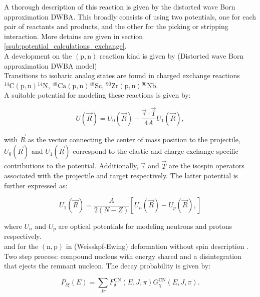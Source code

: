 \documentclass[openany]{book}
\begin{document}
A thorough description of this reaction is given by the distorted wave Born approximation DWBA. This broadly consists of using two potentials, one for each pair of reactants and products, and the other for the picking or stripping interaction. More detains are given in section \ref{ssub:potential_calculations_exchange}. \\

A development on the $\mathrm{(p,n)}$ reaction kind is given by (Distorted wave Born approximation DWBA model) \cite{whitehead_poxon-pearson_nunes_potel_2022} \\

Transitions to isobaric analog states are found in charged exchange reactions $\mathrm{{}^{14}C(p, n){}^{14}N}$, $\mathrm{{}^{48}Ca(p, n){}^{48}Sc}$, $\mathrm{{}^{90}Zr(p, n){}^{90}Nb}$. \\

A suitable potential for modeling these reactions is given by: 

\begin{equation}\label{eq:potential_exchange_optical}
	U(\vec R) = U_0(\vec R) + \frac{\vec \tau \cdot \vec T}{4A} U_1(\vec R),
\end{equation}

with $\vec R$ as the vector connecting the center of mass position to the projectile, $U_0(\vec R)$ and $U_1(\vec R)$ correspond to the elastic and charge-exchange specific contributions to the potential. Additionally, $\vec \tau$ and $\vec T$ are the isospin operators associated with the projectile and target respectively. The latter potential is further expressed as: 

\begin{equation}\label{eq:potential_exchange_optical_Uexchange}
	U_1(\vec R)  = \frac{A}{2(N-Z)} [U_n(\vec R) - U_p(\vec R), ]
\end{equation}

where $U_n$ and $U_p$ are optical potentials for modeling neutrons and protons respectively. \\

and for the $\mathrm{(n,p)}$ in (Weisskpf-Ewing) deformation without spin description \cite{sharma_gandhi_kumar_2022}. \\

Two step process: compound nucleus with energy shared and a disintegration that ejects the remnant nucleon. The decay probability is given by:

\begin{equation}\label{micro_hauserFeshbach_decayP}
	P_{\delta \xi}(E) = \sum_{J\pi} F^{\mathrm{CN}}_{\delta}(E, J, \pi)G^{\mathrm{CN}}_{\chi}(E, J, \pi).
\end{equation}
\end{document}
